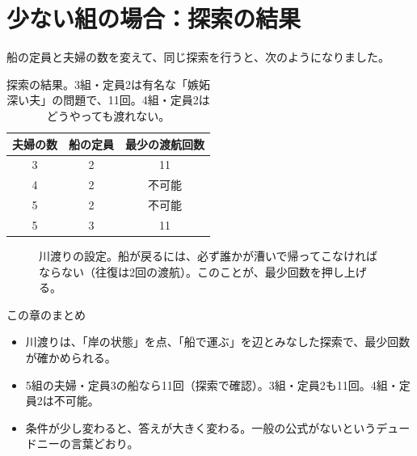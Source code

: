 \documentclass[a4paper,11pt,openany]{ltjsbook}
\begin{document}
\section{少ない組の場合：探索の結果}

船の定員と夫婦の数を変えて、同じ探索を行うと、次のようになりました。

\begin{table}[htbp]
\centering
\begin{tabular}{ccc}
\toprule
夫婦の数 & 船の定員 & 最少の渡航回数\\
\midrule
3 & 2 & 11\\
4 & 2 & 不可能\\
5 & 2 & 不可能\\
5 & 3 & 11\\
\bottomrule
\end{tabular}
\caption{探索の結果。3組・定員2は有名な「嫉妬深い夫」の問題で、11回。4組・定員2はどうやっても渡れない。}
\end{table}

\begin{figure}[htbp]
\centering
{}
\caption{川渡りの設定。船が戻るには、必ず誰かが漕いで帰ってこなければならない（往復は2回の渡航）。このことが、最少回数を押し上げる。}
\end{figure}

\begin{pointbox}{この章のまとめ}
\begin{itemize}[leftmargin=*]
\item 川渡りは、「岸の状態」を点、「船で運ぶ」を辺とみなした探索で、最少回数が確かめられる。
\item 5組の夫婦・定員3の船なら11回（探索で確認）。3組・定員2も11回。4組・定員2は不可能。
\item 条件が少し変わると、答えが大きく変わる。一般の公式がないというデュードニーの言葉どおり。
\end{itemize}
\end{pointbox}
\end{document}

